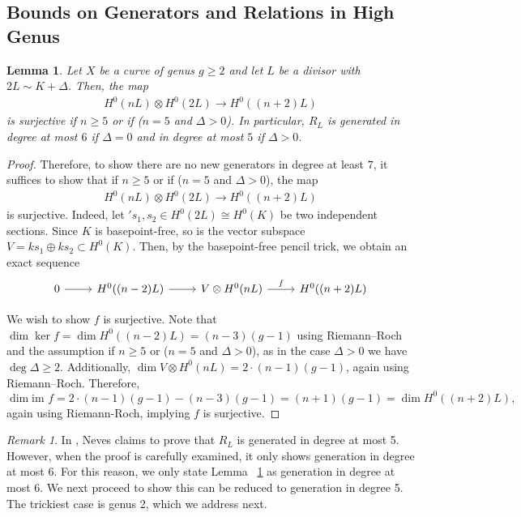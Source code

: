 \documentclass{amsart}
\theoremstyle{plain}
\newtheorem{lem}[thm]{Lemma}
\theoremstyle{definition}
\theoremstyle{remark}
\newtheorem{rem}[thm]{Remark}
\numberwithin{equation}{section}
\newcommand\ssec{\subsection}
\newcommand\im{\text{im }}
\begin{document}
\ssec{Bounds on Generators and Relations in High Genus}

\begin{lem}
\label{lem:semicanonical_generation}
Let $X$ be a curve of genus $g \geq 2$ and let $L$ be a divisor with $2 L \sim K + \Delta$. Then, the map
\begin{align*}
	H^0(nL) \otimes H^0(2L) \rightarrow H^0((n+2)L)
\end{align*}
is surjective if $n \geq 5$ or if ($n = 5$ and $\Delta > 0$).
In particular, $R_L$ is generated in degree at most $6$ if $\Delta = 0$ and in degree at most $5$ if $\Delta > 0$.
\end{lem}
\begin{proof}
Therefore, to show there are no new generators in degree at least $7$, it suffices to show that if $n \geq 5$ or if ($n = 5$ and $\Delta > 0$), the map
\begin{align*}
	H^0(nL) \otimes H^0(2L) \rightarrow H^0((n+2)L)
\end{align*}
is surjective. Indeed, let $'s_1,s_2 \in H^0(2L) \cong H^0(K)$ be two independent sections. 
Since $K$ is basepoint-free, so is the vector subspace $V = ks_1 \oplus k s_2 \subset H^0(K)$. 
Then, by the basepoint-free pencil trick, we obtain an exact sequence
$$\begin{tikzcd}
0 \ar r & H^0((n-2)L) \ar r & V \otimes H^0(nL) \ar{r}{f} & H^0((n+2)L)
\end{tikzcd}$$


We wish to show $f$ is surjective.
Note that $\dim \ker f = \dim H^0((n-2)L) = (n-3)(g - 1)$ using Riemann--Roch and the assumption if $n \geq 5$ or ($n = 5$ and $\Delta > 0$), as in the case $\Delta > 0$ we have $\deg \Delta \geq 2$.
Additionally, $\dim V \otimes H^0(nL) = 2 \cdot (n- 1)(g - 1)$, again using Riemann--Roch.
Therefore, $$\dim \im f = 2 \cdot (n- 1)(g - 1) -(n-3)(g - 1) = (n+ 1)(g - 1) = \dim H^0((n+2)L),$$
again using Riemann-Roch, implying $f$ is surjective.
\end{proof}

\begin{rem}
In \cite[Proposition III.4]{neves:halfcan}, Neves claims to prove that $R_L$ is generated in degree at most 5. However, when the proof is carefully examined, it only shows generation in degree at most 6. For this reason, we only state Lemma ~\ref{lem:semicanonical_generation} as generation in degree at most 6. We next proceed to show this can be reduced to generation in degree 5. The trickiest case is genus 2, which we address next.
\end{rem}
\end{document}
